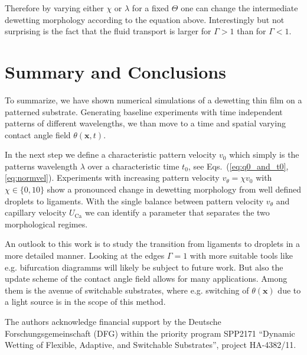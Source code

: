 \documentclass[twocolumn,amsmath,amssymb,showpacs,pre,nofootinbib,superscriptaddress]{revtex4-1} %
\begin{document}
Therefore by varying either $\chi$ or $\lambda$ for a fixed $\Theta$ one can change the intermediate dewetting morphology according to the equation above.
Interestingly but not surprising is the fact that the fluid transport is larger for $\Gamma > 1$ than for $\Gamma < 1$.

\section{Summary and Conclusions}\label{sec:sum_conclu}
To summarize, we have shown numerical simulations of a dewetting thin film on a patterned substrate.
Generating baseline experiments with time independent patterns of different wavelengths, we than move to a time and spatial varying contact angle field $\theta(\mathbf{x},t)$.

In the next step we define a characteristic pattern velocity $v_0$ which simply is the patterns wavelength $\lambda$ over a characteristic time $t_0$, see Eqs.~(\ref{eq:q0_and_t0}, \ref{eq:normvel}).
Experiments with increasing pattern velocity $v_{\theta} = \chi v_0$ with $\chi\in\{0,10\}$ show a pronounced change in dewetting morphology from well defined droplets to ligaments.
With the single balance between pattern velocity $v_{\theta}$ and capillary velocity $U_{\text{Ca}}$ we can identify a parameter that separates the two morphological regimes.

An outlook to this work is to study the transition from ligaments to droplets in a more detailed manner.
Looking at the edges $\Gamma =1$ with more suitable tools like e.g. bifurcation diagramms will likely be subject to future work.
But also the update scheme of the contact angle field allows for many applications.
Among them is the avenue of switchable substrates, where e.g. switching of $\theta(\mathbf{x})$ due to a light source is in the scope of this method.


\begin{acknowledgements}
The authors acknowledge financial support by the Deutsche Forschungsgemeinschaft (DFG) within the priority program SPP2171 ``Dynamic Wetting of Flexible, Adaptive, and Switchable Substrates'', project HA-4382/11.
\end{acknowledgements}



\end{document}
